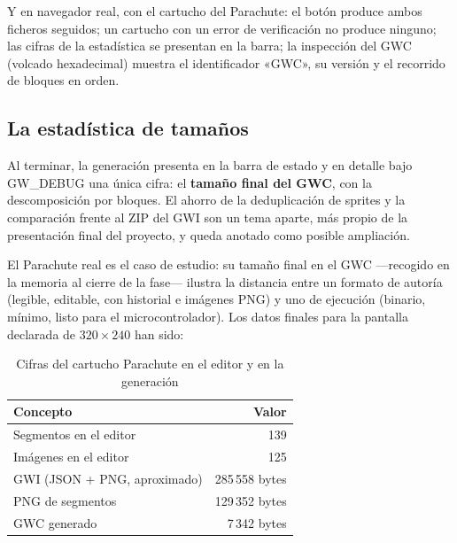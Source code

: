 Y en navegador real, con el cartucho del Parachute: el botón
produce ambos ficheros seguidos; un cartucho con un error de
verificación no produce ninguno; las cifras de la estadística se
presentan en la barra; la inspección del GWC (volcado hexadecimal)
muestra el identificador «GWC», su versión y el recorrido de
bloques en orden.

\subsection{La estadística de tamaños}\label{sec:F5I6Estadistica}

Al terminar, la generación presenta en la barra de estado y en
detalle bajo GW\_DEBUG una única cifra: el \textbf{tamaño final del
	GWC}, con la descomposición por bloques. El ahorro de la
deduplicación de sprites y la comparación frente al ZIP del GWI son
un tema aparte, más propio de la presentación final del proyecto, y
queda anotado como posible ampliación.

El Parachute real es el caso de estudio: su tamaño final en el GWC
—recogido en la memoria al cierre de la fase— ilustra la distancia
entre un formato de autoría (legible, editable, con historial e
imágenes PNG) y uno de ejecución (binario, mínimo, listo para el
microcontrolador). Los datos finales para la pantalla declarada de $320 \times 240$ han sido:


\begin{table}[H]
	\centering	
	\begin{tabular}{lr}
		\toprule
		Concepto & Valor \\
		\midrule
		Segmentos en el editor & 139 \\
		Imágenes en el editor & 125 \\
		GWI (JSON + PNG, aproximado) & 285\,558 bytes \\
		PNG de segmentos & 129\,352 bytes \\
		GWC generado & 7\,342 bytes \\
		\bottomrule
	\end{tabular}
	\caption{Cifras del cartucho Parachute en el editor y en la generación}
	\label{tab:F5I7CifrasParachute}
\end{table}

